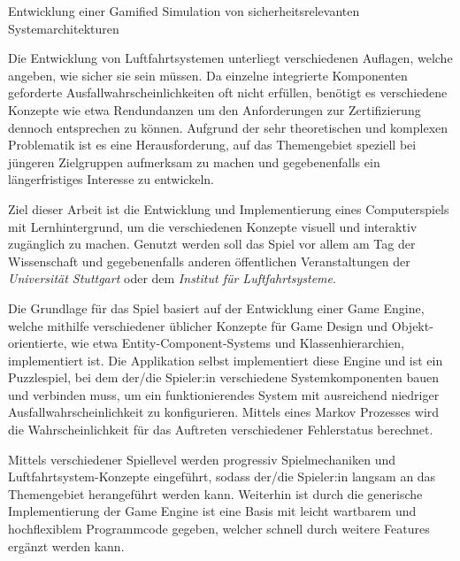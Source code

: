 
{\LARGE Entwicklung einer Gamified Simulation von sicherheitsrelevanten Systemarchitekturen}

Die Entwicklung von Luftfahrtsystemen unterliegt verschiedenen Auflagen, welche angeben, wie sicher sie sein müssen.
Da einzelne integrierte Komponenten geforderte Ausfallwahrscheinlichkeiten oft nicht erfüllen, benötigt es verschiedene
Konzepte wie etwa Rendundanzen um den Anforderungen zur Zertifizierung dennoch entsprechen zu können.
Aufgrund der sehr theoretischen und komplexen Problematik ist es eine Herausforderung, auf das Themengebiet speziell bei
jüngeren Zielgruppen aufmerksam zu machen und gegebenenfalls ein längerfristiges Interesse zu entwickeln.

Ziel dieser Arbeit ist die Entwicklung und Implementierung eines Computerspiels mit Lernhintergrund,
um die verschiedenen Konzepte visuell und interaktiv zugänglich zu machen.
Genutzt werden soll das Spiel vor allem am Tag der Wissenschaft und gegebenenfalls anderen öffentlichen Veranstaltungen der \textit{Universität Stuttgart}
oder dem \textit{Institut für Luftfahrtsysteme}.

Die Grundlage für das Spiel basiert auf der Entwicklung einer Game Engine, welche mithilfe verschiedener üblicher Konzepte
für Game Design und Objekt-orientierte, wie etwa Entity-Component-Systems und Klassenhierarchien, implementiert ist.
Die Applikation selbst implementiert diese Engine und ist ein Puzzlespiel, bei dem der/die Spieler:in verschiedene Systemkomponenten bauen und verbinden
muss, um ein funktionierendes System mit ausreichend niedriger Ausfallwahrscheinlichkeit zu konfigurieren.
Mittels eines Markov Prozesses wird die Wahrscheinlichkeit für das Auftreten verschiedener Fehlerstatus berechnet.

Mittels verschiedener Spiellevel werden progressiv Spielmechaniken und Luftfahrtsystem-Konzepte eingeführt, sodass
der/die Spieler:in langsam an das Themengebiet herangeführt werden kann.
Weiterhin ist durch die generische Implementierung der Game Engine ist eine Basis mit leicht wartbarem und hochflexiblem
Programmcode gegeben, welcher schnell durch weitere Features ergänzt werden kann.